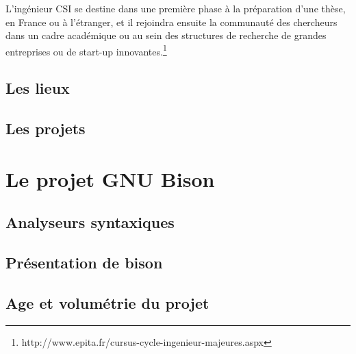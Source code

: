 \documentclass[a4paper,11pt,twoside,final]{article}
\begin{document}
  L'ingénieur CSI se destine dans une première phase à la préparation d'une
  thèse, en France ou à l'étranger, et il rejoindra ensuite la communauté des
  chercheurs dans un cadre académique ou au sein des structures de recherche de
  grandes entreprises ou de start-up innovantes.\footnote{%
  http://www.epita.fr/cursus-cycle-ingenieur-majeures.aspx}

  \subsection{Les lieux}

  \subsection{Les projets}

  \cleardoublepage

  \section{Le projet GNU Bison}

  \subsection{Analyseurs syntaxiques}

  \subsection{Présentation de bison}

  \subsection{Age et volumétrie du projet}


\end{document}
